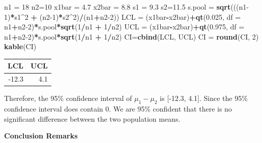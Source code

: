\documentclass[
]{book}
\newenvironment{Shaded}{\begin{snugshade}}{\end{snugshade}}
\newcommand{\AttributeTok}[1]{\textcolor[rgb]{0.13,0.29,0.53}{#1}}
\newcommand{\DecValTok}[1]{\textcolor[rgb]{0.00,0.00,0.81}{#1}}
\newcommand{\FloatTok}[1]{\textcolor[rgb]{0.00,0.00,0.81}{#1}}
\newcommand{\FunctionTok}[1]{\textcolor[rgb]{0.13,0.29,0.53}{\textbf{#1}}}
\newcommand{\NormalTok}[1]{#1}
\newcommand{\OtherTok}[1]{\textcolor[rgb]{0.56,0.35,0.01}{#1}}
\newcommand{\SpecialCharTok}[1]{\textcolor[rgb]{0.81,0.36,0.00}{\textbf{#1}}}
\begin{document}
\begin{Shaded}
\begin{Highlighting}[]
\NormalTok{n1 }\OtherTok{=} \DecValTok{18}
\NormalTok{n2}\OtherTok{=}\DecValTok{10}
\NormalTok{x1bar }\OtherTok{=} \FloatTok{4.7}
\NormalTok{x2bar }\OtherTok{=} \FloatTok{8.8}
\NormalTok{s1 }\OtherTok{=} \FloatTok{9.3}
\NormalTok{s2}\OtherTok{=}\FloatTok{11.5}
\NormalTok{s.pool }\OtherTok{=} \FunctionTok{sqrt}\NormalTok{(((n1}\DecValTok{{-}1}\NormalTok{)}\SpecialCharTok{*}\NormalTok{s1}\SpecialCharTok{\^{}}\DecValTok{2} \SpecialCharTok{+}\NormalTok{ (n2}\DecValTok{{-}1}\NormalTok{)}\SpecialCharTok{*}\NormalTok{s2}\SpecialCharTok{\^{}}\DecValTok{2}\NormalTok{)}\SpecialCharTok{/}\NormalTok{(n1}\SpecialCharTok{+}\NormalTok{n2}\DecValTok{{-}2}\NormalTok{))}
\NormalTok{LCL }\OtherTok{=}\NormalTok{ (x1bar}\SpecialCharTok{{-}}\NormalTok{x2bar)}\SpecialCharTok{+}\FunctionTok{qt}\NormalTok{(}\FloatTok{0.025}\NormalTok{, }\AttributeTok{df =}\NormalTok{ n1}\SpecialCharTok{+}\NormalTok{n2}\DecValTok{{-}2}\NormalTok{)}\SpecialCharTok{*}\NormalTok{s.pool}\SpecialCharTok{*}\FunctionTok{sqrt}\NormalTok{(}\DecValTok{1}\SpecialCharTok{/}\NormalTok{n1 }\SpecialCharTok{+} \DecValTok{1}\SpecialCharTok{/}\NormalTok{n2)}
\NormalTok{UCL }\OtherTok{=}\NormalTok{ (x1bar}\SpecialCharTok{{-}}\NormalTok{x2bar)}\SpecialCharTok{+}\FunctionTok{qt}\NormalTok{(}\FloatTok{0.975}\NormalTok{, }\AttributeTok{df =}\NormalTok{ n1}\SpecialCharTok{+}\NormalTok{n2}\DecValTok{{-}2}\NormalTok{)}\SpecialCharTok{*}\NormalTok{s.pool}\SpecialCharTok{*}\FunctionTok{sqrt}\NormalTok{(}\DecValTok{1}\SpecialCharTok{/}\NormalTok{n1 }\SpecialCharTok{+} \DecValTok{1}\SpecialCharTok{/}\NormalTok{n2)}
\NormalTok{CI}\OtherTok{=}\FunctionTok{cbind}\NormalTok{(LCL, UCL)}
\NormalTok{CI }\OtherTok{=} \FunctionTok{round}\NormalTok{(CI, }\DecValTok{2}\NormalTok{)}
\FunctionTok{kable}\NormalTok{(CI)}
\end{Highlighting}
\end{Shaded}

\begin{tabular}{r|r}
\hline
LCL & UCL\\
\hline
-12.3 & 4.1\\
\hline
\end{tabular}

Therefore, the 95\% confidence interval of \(\mu_1-\mu_2\) is {[}-12.3, 4.1{]}. Since the 95\% confidence interval does contain 0. We are 95\% confident that there is no significant difference between the two population means.

\textbf{Conclusion Remarks}
\end{document}
